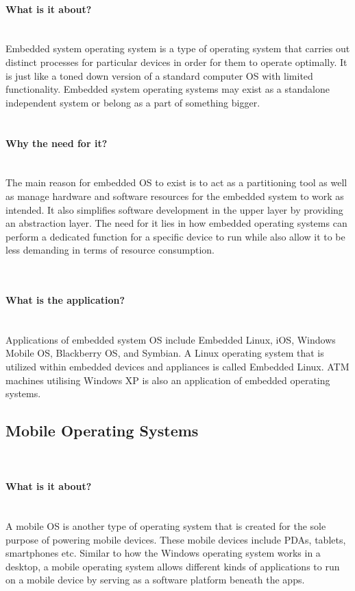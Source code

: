 \documentclass[conference]{IEEEtran}
\newcommand{\forceindent}{\leavevmode{\parindent=1em\indent}}
\begin{document}
\paragraph{What is it about?}\mbox{} \\
\forceindent Embedded system operating system is a type of operating system that carries out distinct processes for particular devices in order for them to operate optimally. It is just like a toned down version of a standard computer OS with limited functionality\cite{TNEOS}. Embedded system operating systems may exist as a standalone independent system or belong as a part of something bigger\cite{ITEOSMC}. \\

\\
\paragraph{Why the need for it?}\mbox{} \\
\forceindent The main reason for embedded OS to exist is to act as a partitioning tool as well as manage hardware and software resources for the embedded system to work as intended. It also simplifies software development in the upper layer by providing an abstraction layer. The need for it lies in how embedded operating systems can perform a dedicated function for a specific device to run while also allow it to be less demanding in terms of resource consumption\cite{ITEOSPV}.

\\
\paragraph{What is the application?}\mbox{} \\
\forceindent Applications of embedded system OS include Embedded Linux, iOS, Windows Mobile OS, Blackberry OS, and Symbian. A Linux operating system that is utilized within embedded devices and appliances is called Embedded Linux. ATM machines utilising Windows XP is also an application of embedded operating systems.

\subsection{Mobile Operating Systems}\\
\paragraph{What is it about?}\mbox{} \\
\forceindent A mobile OS is another type of operating system that is created for the sole purpose of powering mobile devices. These mobile devices include PDAs, tablets, smartphones etc. Similar to how the Windows operating system works in a desktop, a mobile operating system allows different kinds of applications to run on a mobile device by serving as a software platform beneath the apps.
\\
\end{document}
